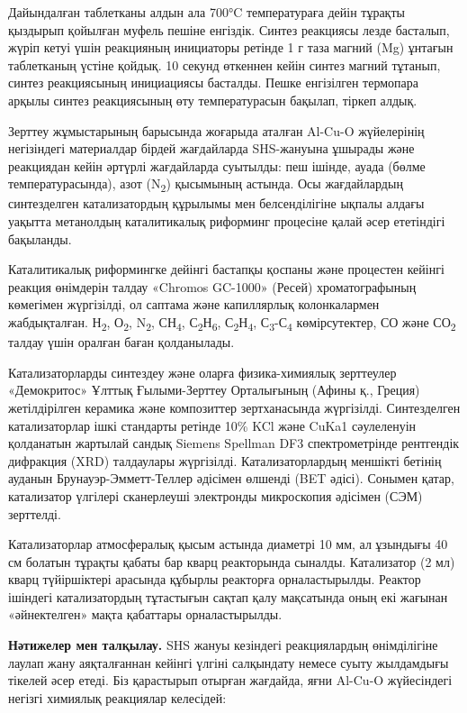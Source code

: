 \begin{multicols}{2}
Дайындалған таблетканы алдын ала 700°C температураға дейін тұрақты
қыздырып қойылған муфель пешіне енгіздік. Синтез реакциясы лезде
басталып, жүріп кетуі үшін реакцияның инициаторы ретінде 1 г таза магний
(Mg) ұнтағын таблетканың үстіне қойдық. 10 секунд өткеннен кейін синтез
магний тұтанып, синтез реакциясының инициациясы басталды. Пешке
енгізілген термопара арқылы синтез реакциясының өту температурасын
бақылап, тіркеп алдық.

Зерттеу жұмыстарының барысында жоғарыда аталған Al-Cu-O жүйелерінің
негізіндегі материалдар бірдей жағдайларда SHS-жануына ұшырады және
реакциядан кейін әртүрлі жағдайларда суытылды: пеш ішінде, ауада (бөлме
температурасында), азот (N\textsubscript{2}) қысымының астында. Осы
жағдайлардың синтезделген катализатордың құрылымы мен белсенділігіне
ықпалы алдағы уақытта метанолдың каталитикалық риформинг процесіне қалай
әсер ететіндігі бақыланды.

Каталитикалық риформингке дейінгі бастапқы қоспаны және процестен
кейінгі реакция өнімдерін талдау «Chromos GC-1000» (Ресей)
хроматографының көмегімен жүргізілді, ол саптама және капиллярлық
колонкалармен жабдықталған. Н\textsubscript{2}, О\textsubscript{2},
N\textsubscript{2}, СН\textsubscript{4},
С\textsubscript{2}Н\textsubscript{6},
С\textsubscript{2}Н\textsubscript{4},
С\textsubscript{3}-С\textsubscript{4} көмірсутектер, СО және
СО\textsubscript{2} талдау үшін оралған баған қолданылады.

Катализаторларды синтездеу және оларға физика-химиялық зерттеулер
«Демокритос» Ұлттық Ғылыми-Зерттеу Орталығының (Афины қ., Греция)
жетілдірілген керамика және композиттер зертханасында жүргізілді.
Синтезделген катализаторлар ішкі стандарты ретінде 10\% KCl және CuKa1
сәулеленуін қолданатын жартылай сандық Siemens Spellman DF3
спектрометрінде рентгендік дифракция (XRD) талдаулары жүргізілді.
Катализаторлардың меншікті бетінің ауданын Брунауэр-Эмметт-Теллер
әдісімен өлшенді (BET әдісі). Сонымен қатар, катализатор үлгілері
сканерлеуші электронды микроскопия әдісімен (СЭМ) зерттелді.

Катализаторлар атмосфералық қысым астында диаметрі 10 мм, ал ұзындығы 40
см болатын тұрақты қабаты бар кварц реакторында сыналды. Катализатор (2
мл) кварц түйіршіктері арасында құбырлы реакторға орналастырылды.
Реактор ішіндегі катализатордың тұтастығын сақтап қалу мақсатында оның
екі жағынан «әйнектелген» мақта қабаттары орналастырылды.

{\bfseries Нәтижелер мен талқылау.} SHS жануы кезіндегі реакциялардың
өнімділігіне лаулап жану аяқталғаннан кейінгі үлгіні салқындату немесе
суыту жылдамдығы тікелей әсер етеді. Біз қарастырып отырған жағдайда,
яғни Al-Cu-O жүйесіндегі негізгі химиялық реакциялар келесідей:


\end{multicols}
